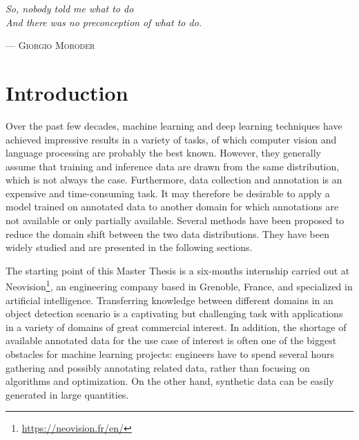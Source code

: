 \documentclass[%
    corpo=12pt,
    twoside,
    stile=classica,   
    tipotesi=magistrale,
    evenboxes,
    english,
	numerazioneromana,
]{toptesi}
\newcommand{\quotes}[1]{``#1''}
\begin{document}

\english

\vspace*{1cm}
\renewcommand{\epigraphsize}{\normalsize}
\setlength{\epigraphwidth}{0.56\textwidth}
\renewcommand{\sourceflush}{flushright}
\let\originalepigraph\epigraph 
\renewcommand\epigraph[2]{\originalepigraph{\textit{#1}}{\textsc{#2}}}
\epigraph{So, nobody told me what to do\\And there was no preconception of what to do.}{--- Giorgio Moroder}

\paginavuota

\indici

\mainmatter
\english

\chapter*{Introduction}
Over the past few decades, machine learning and deep learning techniques have achieved impressive results in a variety of tasks, of which computer vision and language processing are probably the best known. However, they generally assume that training and inference data are drawn from the same distribution, which is not always the case. Furthermore, data collection and annotation is an expensive and time-consuming task. It may therefore be desirable to apply a model trained on annotated data to another domain for which annotations are not available or only partially available. Several methods have been proposed to reduce the domain shift between the two data distributions. They have been widely studied and are presented in the following sections.

\bigskip
The starting point of this Master Thesis is a six-months internship carried out at Neovision\footnote{\url{https://neovision.fr/en/}}, an engineering company based in Grenoble, France, and specialized in artificial intelligence. Transferring knowledge between different domains in an object detection scenario is a captivating but challenging task with applications in a variety of domains of great commercial interest. In addition, the shortage of available annotated data for the use case of interest is often one of the biggest obstacles for machine learning projects: engineers have to spend several hours gathering and possibly annotating related data, rather than focusing on algorithms and optimization. On the other hand, synthetic data can be easily generated in large quantities.
\end{document}
